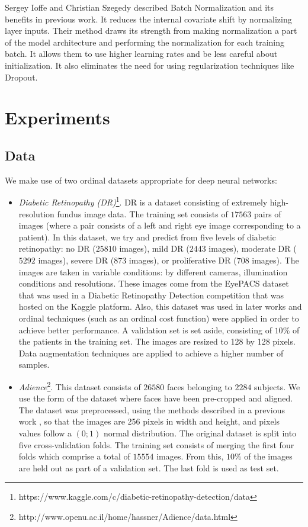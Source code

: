 \documentclass[10pt, a4paper, titlepage, twocolumn]{article}
\begin{document}
	Sergey Ioffe and Christian Szegedy \cite{ioffe2015batch} described Batch Normalization and its benefits in previous work. It reduces the internal covariate shift by normalizing layer inputs. Their method draws its strength from making normalization a part of the model architecture and performing the normalization for each training batch. It allows them to use higher learning rates and be less careful about initialization. It also eliminates the need for using regularization techniques like Dropout.
	
	\section{Experiments}
	\label{sect:experiments}
	\subsection{Data}
	We make use of two ordinal datasets appropriate for deep neural networks:
	
	\begin{itemize}
		\item \textit{Diabetic Retinopathy (DR)}\footnote{https://www.kaggle.com/c/diabetic-retinopathy-detection/data}. DR is a dataset consisting of extremely high-resolution fundus image data. The training set consists of $17563$ pairs of images (where a  pair consists of a left and right eye image corresponding to a patient). In this dataset, we try and predict from five levels of diabetic retinopathy: no DR ($25810$ images), mild DR ($2443$ images), moderate DR ($5292$ images), severe DR ($873$ images), or proliferative DR ($708$ images). The images are taken in variable conditions: by different cameras, illumination conditions and resolutions. These images come from the EyePACS dataset that was used in a Diabetic Retinopathy Detection competition that was hosted on the Kaggle platform. Also, this dataset was used in later works \cite{de2018weighted}\cite{nebot2016diabetic} and ordinal techniques (such as an ordinal cost function) were applied in order to achieve better performance. A validation set is set aside, consisting of $10\%$ of the patients in the training set. The images are resized to 128 by 128 pixels. Data augmentation techniques are applied to achieve a higher number of samples.
		
		\item \textit{Adience}\footnote{http://www.openu.ac.il/home/hassner/Adience/data.html}. This dataset consists of $26580$ faces belonging to $2284$ subjects. We use the form of the dataset where faces have been pre-cropped and aligned. The dataset was preprocessed, using the methods described in a previous work \cite{beckham2017unimodal}, so that the images are 256 pixels in width and height, and pixels values follow a $(0;1)$ normal distribution. The original dataset is split into five cross-validation folds. The training set consists of merging the first four folds which comprise a total of $15554$ images. From this, $10\%$ of the images are held out as part of a validation set. The last fold is used as test set.
	\end{itemize}
	
\end{document}
